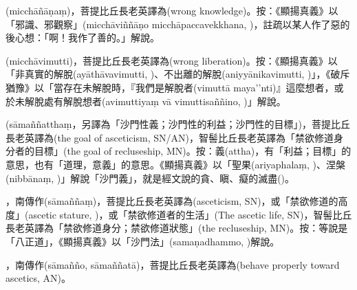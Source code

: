 \startitemgroup[noteitems]
\item{}(micchāñāṇaṃ)，菩提比丘長老英譯為(wrong knowledge)。按：《顯揚真義》以「邪識、邪觀察」(micchāviññāṇo micchāpaccavekkhana, )，註疏以某人作了惡的後心想：「啊！我作了善的。」解說。
\stopitemgroup

\startitemgroup[noteitems]
\item{}(micchāvimutti)，菩提比丘長老英譯為(wrong liberation)。按：《顯揚真義》以「非真實的解脫(ayāthāvavimutti, )、不出離的解脫(aniyyānikavimutti, )」，《破斥猶豫》以「當存在未解脫時，『我們是解脫者(vimuttā maya’’nti)』這麼想者，或於未解脫處有解脫想者(avimuttiyaṃ vā vimuttisaññino, )」解說。
\stopitemgroup

\startitemgroup[noteitems]
\item{}(sāmaññatthaṃ，另譯為「沙門性義；沙門性的利益；沙門性的目標」)，菩提比丘長老英譯為(the goal of asceticism, SN/AN)，智髻比丘長老英譯為「禁欲修道身分者的目標」(the goal of recluseship, MN)。按：義(attha)，有「利益；目標」的意思，也有「道理，意義」的意思。《顯揚真義》以「聖果(ariyaphalaṃ, )、涅槃(nibbānaṃ, )」解說「沙門義」，就是經文說的貪、瞋、癡的滅盡()。
\stopitemgroup

\startitemgroup[noteitems]
\item{}，南傳作(sāmaññaṃ)，菩提比丘長老英譯為(asceticism, SN)，或「禁欲修道的高度」(ascetic stature, )，或「禁欲修道者的生活」(The ascetic life, SN)，智髻比丘長老英譯為「禁欲修道身分；禁欲修道狀態」(the recluseship, MN)。按：等說是「八正道」，《顯揚真義》以「沙門法」(samaṇadhammo, )解說。
\item{}，南傳作(sāmañño, sāmaññatā)，菩提比丘長老英譯為(behave properly toward ascetics, AN)。
\stopitemgroup

